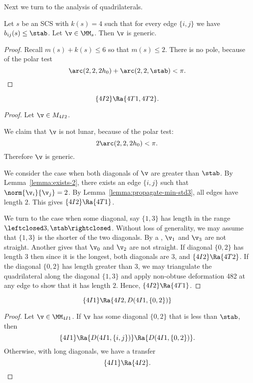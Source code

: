 Next we turn to the analysis of quadrilaterals.

\begin{lemma}[]
Let $s$ be an SCS with $k(s)=4$ such that for every edge $\{i,j\}$ we have $b_{ij}(s)\le\stab$.
Let $\v\in \MM_s$.  Then $\v$ is generic.
\end{lemma}

\begin{proof}
Recall $m(s) + k(s) \le 6$ so that $m(s)\le 2$.
There is no pole, because of the polar test
\[
\arc(2,2,2h_0) + \arc(2,2,\stab) < \pi.
\]
\end{proof}


\begin{lemma}[]
\[
\{4I2\}\Ra \{4T1,4T2\}.
\]
\end{lemma}

\begin{proof}
Let $\v\in M_{4I2}$.

We claim that $\v$ is not lunar, because of the polar test:
\[
2 \arc(2,2,2h_0) < \pi.
\]
Therefore $\v$ is generic.

We consider the case when both diagonals of $\v$ are greater than $\stab$.
By Lemma~\ref{lemma:exists-2}, there exists an edge $\{i,j\}$ such that $\norm{\v_i}{\v_j}=2$.
By Lemma~\ref{lemma:propagate-min-std3}, all edges have length $2$.  This gives $\{4I2\}\Ra\{4T1\}$.

We turn to the case when some diagonal, say $\{1,3\}$ has length in the range $\leftclosed 3,\stab\rightclosed$.
Without loss of generality, we may assume that $\{1,3\}$ is the shorter of the two diagonals.
By a , $\v_1$ and $\v_3$ are not straight.  Another  gives that $\v_0$ and $\v_2$
are not straight.
If diagonal $\{0,2\}$ has length $3$ then since it is the longest, both diagonals are $3$, and $\{4I2\}\Ra\{4T2\}$.
If the diagonal $\{0,2\}$ has length greater than $3$, we may triangulate the quadrilateral along the diagonal
$\{1,3\}$ and apply non-obtuse deformation 482 at any edge to show that it has length $2$.  Hence,
$\{4I2\}\Ra\{4T1\}$.
\end{proof}

\begin{lemma}[]
\[
\{4I1\}\Ra \{4I2,D(4I1,\{0,2\})\}
\]
\end{lemma}

\begin{proof}  Let $\v\in \MM_{4I1}$.  If $\v$ has some diagonal $\{0,2\}$ that is less than $\stab$,
then
\[
\{4I1\}\Ra\{D(4I1,\{i,j\})\}\Ra\{D(4I1,\{0,2\})\}.
\]
Otherwise, with long diagonals, we have a transfer
\[
\{4I1\}\Ra \{4I2\}.
\]
\end{proof}

